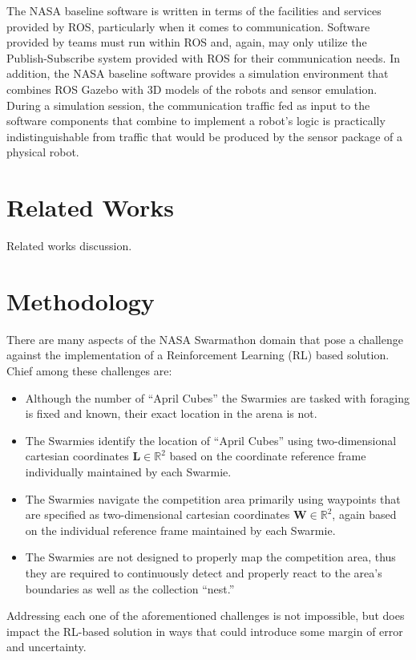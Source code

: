 \documentclass[sigconf,authordraft]{acmart}
\begin{document}
The NASA baseline software is written in terms of the facilities and services
provided by ROS, particularly when it comes to communication. Software provided
by teams must run within ROS and, again, may only utilize the Publish-Subscribe
system provided with ROS for their communication needs. In addition, the NASA
baseline software provides a simulation environment that combines ROS Gazebo
with 3D models of the robots and sensor emulation. During a simulation session,
the communication traffic fed as input to the software components that combine
to implement a robot's logic is practically indistinguishable from traffic that
would be produced by the sensor package of a physical robot.

\section{Related Works}\label{sec:related_works}
Related works discussion.

\section{Methodology}\label{sec:methodology}
There are many aspects of the NASA Swarmathon domain that pose a challenge against the implementation of a Reinforcement Learning (RL) based solution. Chief among these challenges are:

\begin{itemize}
  \item Although the number of ``April Cubes'' the Swarmies are tasked with foraging is fixed and known, their exact location in the arena is not.
  \item The Swarmies identify the location of ``April Cubes'' using two-dimensional cartesian coordinates $\textbf{L} \in \mathbb{R}^2$ based on the coordinate reference frame individually maintained by each Swarmie.
  \item The Swarmies navigate the competition area primarily using waypoints that are specified as two-dimensional cartesian coordinates $\textbf{W} \in \mathbb{R}^2$, again based on the individual reference frame maintained by each Swarmie.
  \item The Swarmies are not designed to properly map the competition area, thus they are required to continuously detect and properly react to the area's boundaries as well as the collection ``nest.''
\end{itemize}

Addressing each one of the aforementioned challenges is not impossible, but does impact the RL-based solution in ways that could introduce some margin of error and uncertainty.
\end{document}
